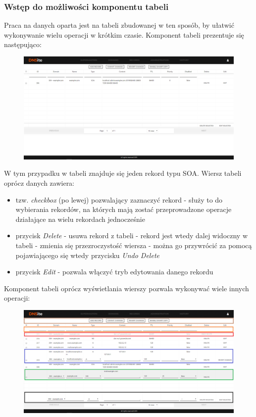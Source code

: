 \documentclass[12pt] {article}
\begin{document}
\subsubsection{Wstęp do możliwości komponentu tabeli}
Praca na danych oparta jest na tabeli zbudowanej w ten sposób, by ułatwić wykonywanie wielu operacji w krótkim czasie. Komponent tabeli prezentuje się następująco:
\begin{figure}[H]
\centering
\includegraphics[width=\textwidth]{res/x_tabela}
\end{figure}
W tym przypadku w tabeli znajduje się jeden rekord typu SOA. Wiersz tabeli oprócz danych zawiera:
\begin{itemize}
\item tzw. \emph{checkbox} (po lewej) pozwalający zaznaczyć rekord - służy to do wybierania rekordów, na których mają zostać przeprowadzone operacje działające na wielu rekordach jednocześnie
\item przycisk \emph{Delete} - usuwa rekord z tabeli - rekord jest wtedy dalej widoczny w tabeli - zmienia się przezroczystość wiersza - można go przywrócić za pomocą pojawiającego się wtedy przycisku \emph{Undo Delete}
\item przycisk \emph{Edit} - pozwala włączyć tryb edytowania danego rekordu
\end{itemize}
Komponent tabeli oprócz wyświetlania wierszy pozwala wykonywać wiele innych operacji:
\begin{figure}[H]
\centering
\includegraphics[width=\textwidth]{res/x_tabela_komponenty}
\end{figure}
\end{document}
